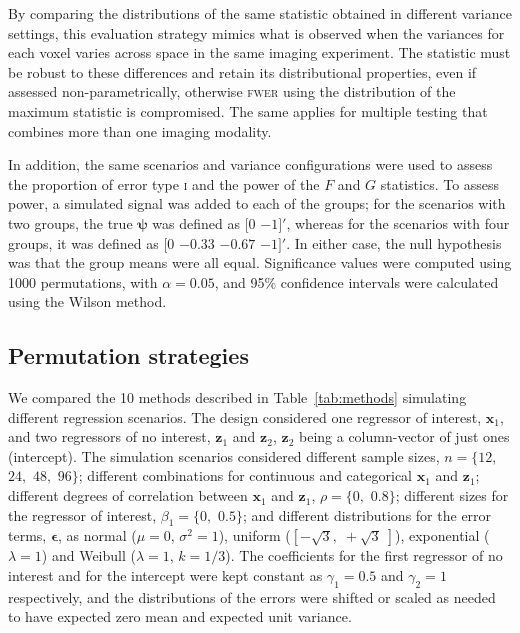 By comparing the distributions of the same statistic obtained in different variance settings, this evaluation strategy mimics what is observed when the variances for each voxel varies across space in the same imaging experiment. The statistic must be robust to these differences and retain its distributional properties, even if assessed non-parametrically, otherwise \textsc{fwer} using the distribution of the maximum statistic is compromised. The same applies for multiple testing that combines more than one imaging modality.

In addition, the same scenarios and variance configurations were used to assess the proportion of error type \textsc{i} and the power of the $F$ and $G$ statistics. To assess power, a simulated signal was added to each of the groups; for the scenarios with two groups, the true $\boldsymbol{\psi}$ was defined as $[0$ $-1]'$, whereas for the scenarios with four groups, it was defined as $[0$  $-0.33$ $-0.67$ $-1]'$. In either case, the null hypothesis was that the group means were all equal. Significance values were computed using 1000 permutations, with $\alpha=0.05$, and 95\% confidence intervals were calculated using the Wilson method.

\subsection{Permutation strategies}
\label{sec:perm:method_perm}

We compared the 10 methods described in Table~\ref{tab:methods} simulating different regression scenarios. The design considered one regressor of interest, $\mathbf{x}_{1}$, and two regressors of no interest, $\mathbf{z}_{1}$ and $\mathbf{z}_{2}$, $\mathbf{z}_{2}$ being a column-vector of just ones (intercept). The simulation scenarios considered different sample sizes, $n=\{12,$ $24,$ $48,$ $96\}$; different combinations for continuous and categorical $\mathbf{x}_{1}$ and $\mathbf{z}_{1}$; different degrees of correlation between $\mathbf{x}_{1}$ and $\mathbf{z}_{1}$, $\rho = \{0,$ $0.8\}$; different sizes for the regressor of interest, $\beta_{1}=\{0,$ $0.5\}$; and different distributions for the error terms, $\boldsymbol{\epsilon}$, as normal ($\mu=0$, $\sigma^2=1$), uniform ($\left[-\sqrt{3},\; +\sqrt{3}\;\right]$), exponential ($\lambda=1$) and Weibull ($\lambda=1$, $k=1/3$). The coefficients for the first regressor of no interest and for the intercept were kept constant as $\gamma_{1}=0.5$ and $\gamma_{2}=1$ respectively, and the distributions of the errors were shifted or scaled as needed to have expected zero mean and expected unit variance.

